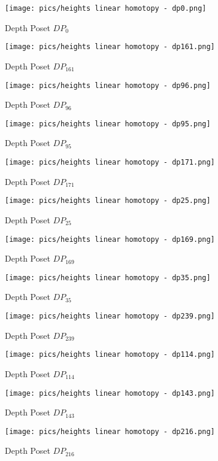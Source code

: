\documentclass{article}
\begin{document}
\begin{figure}[h]
    \centering
    \texttt{[image: pics/heights linear homotopy - dp0.png]}
    \caption{Depth Poset $DP_{0}$}
    \label{fig:dp0}
\end{figure}
\begin{figure}[h]
    \centering
    \texttt{[image: pics/heights linear homotopy - dp161.png]}
    \caption{Depth Poset $DP_{161}$}
    \label{fig:dp161}
\end{figure}
\begin{figure}[h]
    \centering
    \texttt{[image: pics/heights linear homotopy - dp96.png]}
    \caption{Depth Poset $DP_{96}$}
    \label{fig:dp96}
\end{figure}
\begin{figure}[h]
    \centering
    \texttt{[image: pics/heights linear homotopy - dp95.png]}
    \caption{Depth Poset $DP_{95}$}
    \label{fig:dp95}
\end{figure}
\begin{figure}[h]
    \centering
    \texttt{[image: pics/heights linear homotopy - dp171.png]}
    \caption{Depth Poset $DP_{171}$}
    \label{fig:dp171}
\end{figure}
\begin{figure}[h]
    \centering
    \texttt{[image: pics/heights linear homotopy - dp25.png]}
    \caption{Depth Poset $DP_{25}$}
    \label{fig:dp25}
\end{figure}
\begin{figure}[h]
    \centering
    \texttt{[image: pics/heights linear homotopy - dp169.png]}
    \caption{Depth Poset $DP_{169}$}
    \label{fig:dp169}
\end{figure}
\begin{figure}[h]
    \centering
    \texttt{[image: pics/heights linear homotopy - dp35.png]}
    \caption{Depth Poset $DP_{35}$}
    \label{fig:dp35}
\end{figure}
\begin{figure}[h]
    \centering
    \texttt{[image: pics/heights linear homotopy - dp239.png]}
    \caption{Depth Poset $DP_{239}$}
    \label{fig:dp239}
\end{figure}
\begin{figure}[h]
    \centering
    \texttt{[image: pics/heights linear homotopy - dp114.png]}
    \caption{Depth Poset $DP_{114}$}
    \label{fig:dp114}
\end{figure}
\begin{figure}[h]
    \centering
    \texttt{[image: pics/heights linear homotopy - dp143.png]}
    \caption{Depth Poset $DP_{143}$}
    \label{fig:dp143}
\end{figure}
\begin{figure}[h]
    \centering
    \texttt{[image: pics/heights linear homotopy - dp216.png]}
    \caption{Depth Poset $DP_{216}$}
    \label{fig:dp216}
\end{figure}
\end{document}
